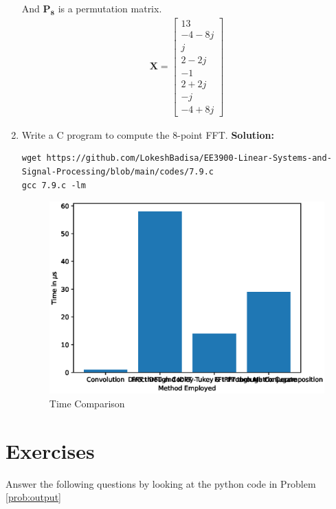 \documentclass[journal,12pt,twocolumn]{IEEEtran}
\newcommand{\solution}{\noindent \textbf{Solution: }}
\let\vec\mathbf
\numberwithin{equation}{section}
\renewcommand\thesection{\arabic{section}}
\begin{document}
\begin{enumerate}[label=\arabic*.,ref=\thesection.\theenumi]
And $\vec{P_8}$ is a permutation matrix.
\begin{align}
\vec{X}=\begin{bmatrix}
 13\\-4-8j\\j\\ 2-2j\\ -1\\ 2+2j\\ -j\\ -4+8j
\end{bmatrix}
\end{align}
\item Write a C program to compute the 8-point FFT.
\solution \begin{lstlisting} 
wget https://github.com/LokeshBadisa/EE3900-Linear-Systems-and-Signal-Processing/blob/main/codes/7.9.c
gcc 7.9.c -lm
\end{lstlisting}
\begin{figure}[!ht]
		\centering
		\includegraphics[width=\columnwidth]{./figs/TimeComparison.eps}
		\caption{Time Comparison}
		\label{fig-7.13}	
	\end{figure}
 \end{enumerate}
	\section{Exercises}
	Answer the following questions by looking at the python code in Problem \ref{prob:output}
	
\end{document}
